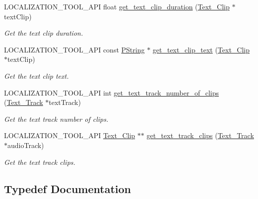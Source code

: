 \begin{DoxyCompactItemize}
L\+O\+C\+A\+L\+I\+Z\+A\+T\+I\+O\+N\+\_\+\+T\+O\+O\+L\+\_\+\+A\+PI float \mbox{\hyperlink{namespaceprz_af5b673ead16373948262d632b38d0343}{get\+\_\+text\+\_\+clip\+\_\+duration}} (\mbox{\hyperlink{classprz_1_1_text___clip}{Text\+\_\+\+Clip}} $\ast$text\+Clip)
\begin{DoxyCompactList}\small\item\em Get the text clip duration. \end{DoxyCompactList}\item 
L\+O\+C\+A\+L\+I\+Z\+A\+T\+I\+O\+N\+\_\+\+T\+O\+O\+L\+\_\+\+A\+PI const \mbox{\hyperlink{classprz_1_1_p_string}{P\+String}} $\ast$ \mbox{\hyperlink{namespaceprz_a007de1ffd5893fd30640a9117d09245a}{get\+\_\+text\+\_\+clip\+\_\+text}} (\mbox{\hyperlink{classprz_1_1_text___clip}{Text\+\_\+\+Clip}} $\ast$text\+Clip)
\begin{DoxyCompactList}\small\item\em Get the text clip text. \end{DoxyCompactList}\item 
L\+O\+C\+A\+L\+I\+Z\+A\+T\+I\+O\+N\+\_\+\+T\+O\+O\+L\+\_\+\+A\+PI int \mbox{\hyperlink{namespaceprz_a479605aa22a06a3128174b575a312da7}{get\+\_\+text\+\_\+track\+\_\+number\+\_\+of\+\_\+clips}} (\mbox{\hyperlink{classprz_1_1_text___track}{Text\+\_\+\+Track}} $\ast$text\+Track)
\begin{DoxyCompactList}\small\item\em Get the text track number of clips. \end{DoxyCompactList}\item 
L\+O\+C\+A\+L\+I\+Z\+A\+T\+I\+O\+N\+\_\+\+T\+O\+O\+L\+\_\+\+A\+PI \mbox{\hyperlink{classprz_1_1_text___clip}{Text\+\_\+\+Clip}} $\ast$$\ast$ \mbox{\hyperlink{namespaceprz_abd2d4f20a28459ce750fa2d4de97ab92}{get\+\_\+text\+\_\+track\+\_\+clips}} (\mbox{\hyperlink{classprz_1_1_text___track}{Text\+\_\+\+Track}} $\ast$audio\+Track)
\begin{DoxyCompactList}\small\item\em Get the text track clips. \end{DoxyCompactList}\end{DoxyCompactItemize}


\subsection{Typedef Documentation}
\mbox{\label{namespaceprz_a2d8e9eeb62cf098759f1fff869da67f7}} 
